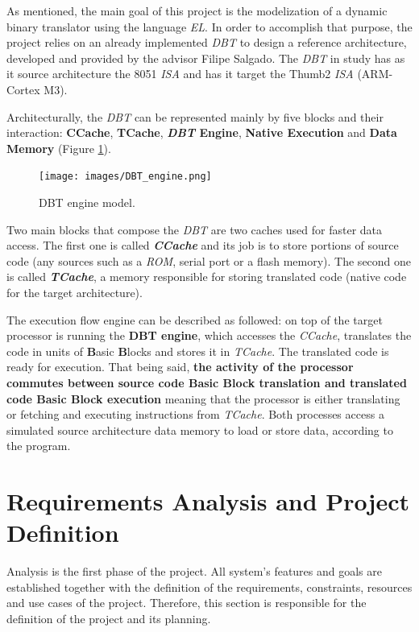 \documentclass[12pt]{article}
\begin{document}
{As mentioned, the main goal of this project is the modelization of a dynamic binary translator using the language \textit{EL}. In order to accomplish that purpose, the project relies on an already implemented \textit{DBT} to design a reference architecture, developed and provided by the advisor Filipe Salgado. The \textit{DBT} in study has as it source architecture the 8051 \textit{ISA} and has it target the Thumb2 \textit{ISA }(ARM-Cortex M3). 

Architecturally, the \textit{DBT}  can be represented mainly by five blocks and their interaction: \textbf{CCache}, \textbf{TCache}, \textbf{\textit{DBT} Engine}, \textbf{Native Execution} and \textbf{Data Memory} (Figure \ref{fig:DBT_Engine}).

\begin{figure}[!htb]
\centering
\texttt{[image: images/DBT\_engine.png]}
\caption{DBT engine model.}
\label{fig:DBT_Engine} 
\end{figure}

Two main blocks that compose the \textit{DBT} are two caches used for faster data access. The first one is called \textit{\textbf{CCache}} and its job is to store portions of source code (any sources such as a \textit{ROM}, serial port or a flash memory). The second one is called \textit{\textbf{TCache}}, a memory responsible for storing translated code (native code for the target architecture).

The execution flow engine can be described as followed: on top of the target processor is running the \textbf{DBT engine}, which accesses the \textit{CCache}, translates the code in units of \textbf{B}asic \textbf{B}locks and stores it in \textit{TCache}. The translated code is ready for execution. That being said, \textbf{the activity of the processor commutes between source code Basic Block translation and translated code Basic Block execution} meaning that the processor is either translating or fetching and executing instructions from \textit{TCache}. Both processes access a simulated source architecture data memory to load or store data, according to the program. \cite{DBT1}





\newpage
\section{Requirements Analysis and Project Definition}
Analysis is the first phase of the project. All system's features and goals are established together with the definition of the requirements, constraints, resources and use cases of the project. Therefore, this section is responsible for the definition of the project and its planning.

}
\end{document}

